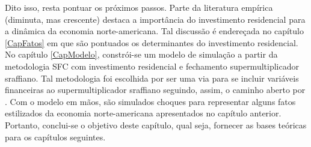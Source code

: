 Dito isso, resta pontuar os próximos passos.
Parte da literatura empírica (diminuta, mas crescente) destaca a importância do investimento residencial para a dinâmica da economia norte-americana. 
Tal discussão é endereçada no capítulo \ref{CapFatos} em que são pontuados os determinantes do investimento residencial.
No capítulo \ref{CapModelo},  
constrói-se um modelo de simulação a partir da metodologia SFC com investimento residencial e fechamento supermultiplicador sraffiano. Tal metodologia foi escolhida por ser uma via para se incluir variáveis financeiras ao supermultiplicador sraffiano seguindo, assim, o caminho aberto por \textcite{brochier_supermultiplier_2018}.
Com o modelo em mãos, são simulados choques para representar alguns fatos estilizados da economia norte-americana apresentados no capítulo anterior.
Portanto, conclui-se o objetivo deste capítulo, qual seja, fornecer as bases teóricas para os capítulos seguintes.


